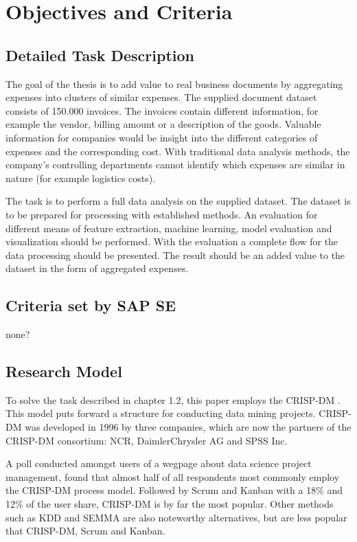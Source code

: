 \chapter{Objectives and Criteria}
\section{Detailed Task Description}
The goal of the thesis is to add value to real business documents by aggregating expenses into clusters of similar expenses. The supplied document dataset consists of 150.000 invoices. The invoices contain different information, for example the vendor, billing amount or a description of the goods. Valuable information for companies would be insight into the different categories of expenses and the corresponding cost. With traditional data analysis methods, the company’s controlling departments cannot identify which expenses are similar in nature (for example logistics costs). 

The task is to perform a full data analysis on the supplied dataset. The dataset is to be prepared for processing with established methods. An evaluation for different means of feature extraction, machine learning, model evaluation and visualization should be performed. With the evaluation a complete flow for the data processing should be presented. The result should be an added value to the dataset in the form of aggregated expenses.

\section{Criteria set by SAP SE}
none?

\section{Research Model}

To solve the task described in chapter 1.2, this paper employs the \ac{CRISP-DM} \cite{CRISPDM2000}. This model puts forward a structure for conducting data mining projects. \ac{CRISP-DM} was developed in 1996 by three companies, which are now the partners of the \ac{CRISP-DM} consortium: NCR, DaimlerChrysler AG and SPSS Inc. 

A poll \cite{CRISPDMPopular2020} conducted amongst users of a wegpage about data science project management, found that almost half of all respondents most commonly employ the \ac{CRISP-DM} process model. Followed by Scrum and Kanban with a 18\% and 12\% of the user share, \ac{CRISP-DM} is by far the most popular. Other methods such as \ac{KDD} and \ac{SEMMA} are also noteworthy alternatives, but are less popular that CRISP-DM, Scrum and Kanban.


